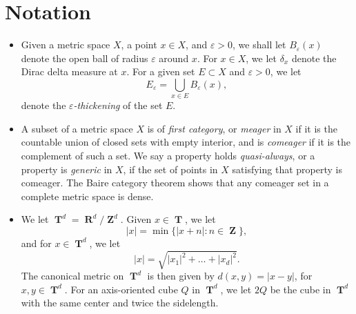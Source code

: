 \documentclass[dvipsnames,letterpaper,12pt]{article}
\numberwithin{equation}{section}
\DeclareMathOperator{\RR}{\mathbf{R}}
\DeclareMathOperator{\ZZ}{\mathbf{Z}}
\DeclareMathOperator{\TT}{\mathbf{T}}
\newtheorem{theorem}{Theorem}
\numberwithin{theorem}{section}
\begin{document}

\section{Notation} \label{notationSection}

\begin{itemize}

    \item Given a metric space $X$, a point $x \in X$, and $\varepsilon > 0$, we shall let $B_\varepsilon(x)$ denote the open ball of radius $\varepsilon$ around $x$. For $x \in X$, we let $\delta_x$ denote the Dirac delta measure at $x$. For a given set $E \subset X$ and $\varepsilon > 0$, we let
    \[ E_\varepsilon = \bigcup_{x \in E} B_\varepsilon(x), \]
    denote the \emph{$\varepsilon$-thickening} of the set $E$.

    \item A subset of a metric space $X$ is of \emph{first category}, or \emph{meager} in $X$ if it is the countable union of closed sets with empty interior, and is \emph{comeager} if it is the complement of such a set. We say a property holds \emph{quasi-always}, or a property is \emph{generic} in $X$, if the set of points in $X$ satisfying that property is comeager. The Baire category theorem shows that any comeager set in a complete metric space is dense.

    \item We let $\TT^d = \RR^d/\ZZ^d$. Given $x \in \TT$, we let
    \[ |x| = \min \{ |x + n| : n \in \ZZ \}, \]
    and for $x \in \TT^d$, we let
    \[ |x| = \sqrt{|x_1|^2 + \dots + |x_d|^2}. \]
    The canonical metric on $\TT^d$ is then given by $d(x,y) = |x - y|$, for $x,y \in \TT^d$. For an axis-oriented cube $Q$ in $\TT^d$, we let $2Q$ be the cube in $\TT^d$ with the same center and twice the sidelength.


\end{itemize}
\end{document}
